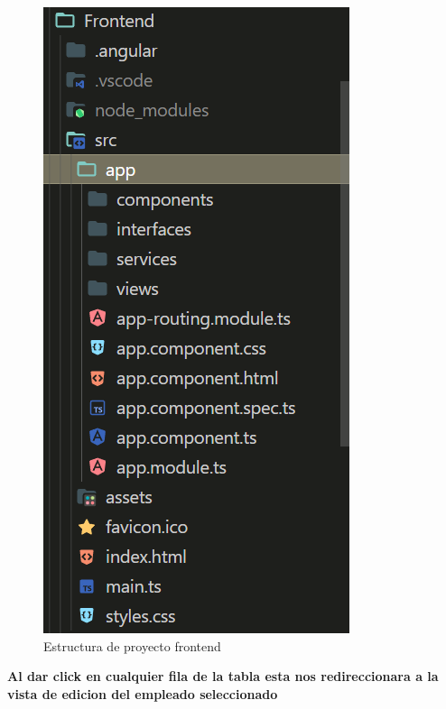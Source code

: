 \documentclass{article}
\begin{document}
        \begin{figure}[ht]
            \centering
            \includegraphics[scale=0.5]{img/img10.png}
            \caption{Estructura de proyecto frontend}
            \label{fig:enter-label}
        \end{figure}
        \textbf{Al dar click en cualquier fila de la tabla esta nos redireccionara a la vista de edicion del empleado seleccionado}

    \newpage
\end{document}
